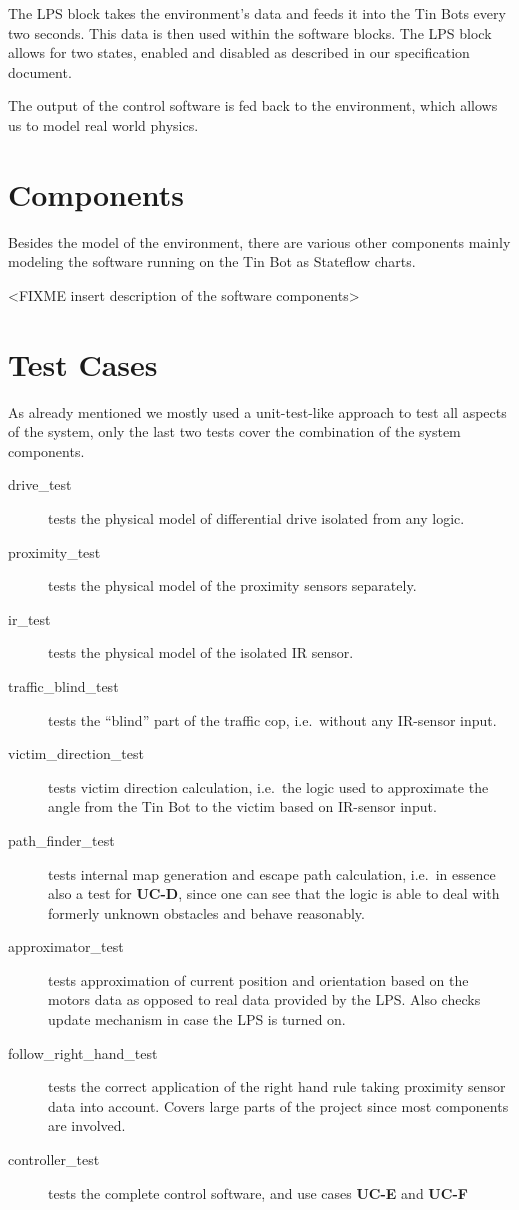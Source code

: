 \documentclass[a4paper,parskip,headheight=38pt]{scrartcl} %
\begin{document}
The LPS block takes the environment's data and feeds it into the Tin Bots every two seconds. This data is then used within the software blocks. The LPS block allows for two states, enabled and disabled as described in our specification document.

The output of the control software is fed back to the environment, which allows us to model real world physics.

\section{Components}
Besides the model of the environment, there are various other components mainly modeling the software running on the Tin Bot as Stateflow charts.

<FIXME insert description of the software components>

\section{Test Cases}
As already mentioned we mostly used a unit-test-like approach to test all aspects of the system, only the last two tests cover the combination of the system components.

\begin{description}
\item[drive\_test] tests the physical model of differential drive isolated from any logic.
\item[proximity\_test] tests the physical model of the proximity sensors separately. %
\item[ir\_test] tests the physical model of the isolated IR sensor.
\item[traffic\_blind\_test] tests the \enquote{blind} part of the traffic cop, i.e.\ without any IR-sensor input.
\item[victim\_direction\_test] tests victim direction calculation, i.e.\ the logic used to approximate the angle from the Tin Bot to the victim based on IR-sensor input.
\item[path\_finder\_test] tests internal map generation and escape path calculation, i.e.\ in essence also a test for \textbf{UC-D}, since one can see that the logic is able to deal with formerly unknown obstacles and behave reasonably.
\item[approximator\_test] tests approximation of current position and orientation based on the motors data as opposed to real data provided by the LPS. Also checks update mechanism in case the LPS is turned on.
\item[follow\_right\_hand\_test] tests the correct application of the right hand rule taking proximity sensor data into account. Covers large parts of the project since most components are involved.
\item[controller\_test] tests the complete control software, and use cases \textbf{UC-E} and \textbf{UC-F}
\end{description}
\end{document}
